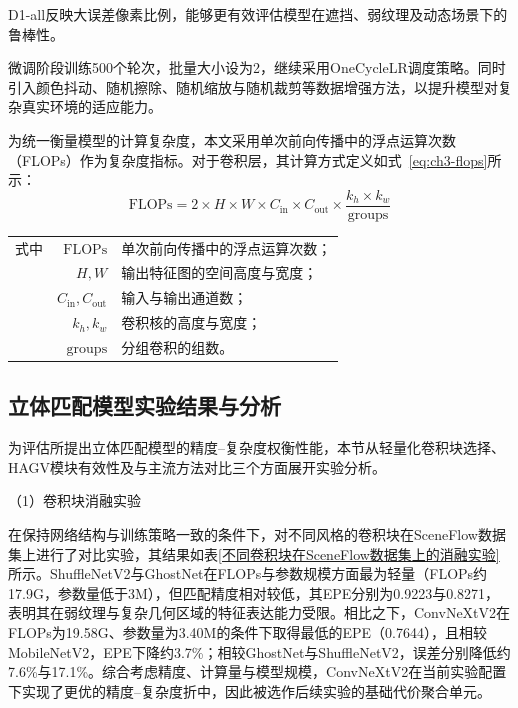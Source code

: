 D1-all反映大误差像素比例，能够更有效评估模型在遮挡、弱纹理及动态场景下的鲁棒性。

微调阶段训练500个轮次，批量大小设为2，继续采用OneCycleLR调度策略。同时引入颜色抖动、随机擦除、随机缩放与随机裁剪等数据增强方法，以提升模型对复杂真实环境的适应能力。

为统一衡量模型的计算复杂度，本文采用单次前向传播中的浮点运算次数（FLOPs）作为复杂度指标。对于卷积层，其计算方式定义如式~\eqref{eq:ch3-flops}所示：
\begin{equation}\label{eq:ch3-flops}
\mathrm{FLOPs}=2\times H\times W\times C_{\mathrm{in}}\times C_{\mathrm{out}}\times \frac{k_h\times k_w}{\mathrm{groups}}
\end{equation}
\begin{tabularx}{\textwidth}{@{}l@{\quad}r@{———}X@{}}
式中& $\mathrm{FLOPs}$ & 单次前向传播中的浮点运算次数；\\
& $H, W$ & 输出特征图的空间高度与宽度；\\
& $C_{\mathrm{in}}, C_{\mathrm{out}}$ & 输入与输出通道数；\\
& $k_h, k_w$ & 卷积核的高度与宽度；\\
& $\mathrm{groups}$ & 分组卷积的组数。\\
\end{tabularx}\vspace{3.15bp}

\subsection{立体匹配模型实验结果与分析}

为评估所提出立体匹配模型的精度--复杂度权衡性能，本节从轻量化卷积块选择、HAGV模块有效性及与主流方法对比三个方面展开实验分析。

（1）卷积块消融实验

在保持网络结构与训练策略一致的条件下，对不同风格的卷积块在SceneFlow数据集\cite{mayerLargeDatasetTrain2016}上进行了对比实验，其结果如表\ref{不同卷积块在SceneFlow数据集上的消融实验}所示。ShuffleNetV2与GhostNet\cite{hanGhostnetMoreFeatures2020a}在FLOPs与参数规模方面最为轻量（FLOPs约17.9G，参数量低于3M），但匹配精度相对较低，其EPE分别为0.9223与0.8271，表明其在弱纹理与复杂几何区域的特征表达能力受限。相比之下，ConvNeXtV2\cite{wooConvnextV2Codesigning2023a}在FLOPs为19.58G、参数量为3.40M的条件下取得最低的EPE（0.7644），且相较MobileNetV2\cite{sandlerMobilenetv2InvertedResiduals2018}，EPE下降约3.7\%；相较GhostNet与ShuffleNetV2，误差分别降低约7.6\%与17.1\%。综合考虑精度、计算量与模型规模，ConvNeXtV2在当前实验配置下实现了更优的精度–复杂度折中，因此被选作后续实验的基础代价聚合单元。

